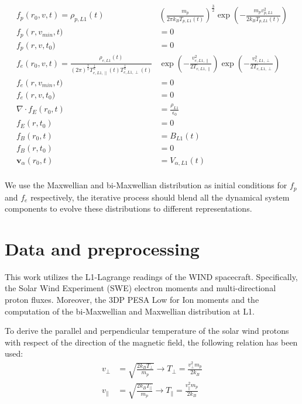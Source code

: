 \documentclass[12pt]{article}
\begin{document}
\begin{align*}
    f_p(r_0, v, t) = \rho_{p, L1}(t) &\left( \frac{m_p}{2 \pi k_B T_{p, L1}(t)}\right)^{\frac{3}{2}} \exp\left({-\frac{m_p v_{p, L1}^2}{2k_BT_{p, L1}(t)}}  \right) \\
    f_p\left(r, v_{min}, t) &= 0 \\
    f_p\left(r, v, t_0) &= 0 \\
        f_e(r_0, v, t) = \frac{\rho_{e, L1}(t)}{\left( 2 \pi \right)^{\frac{3}{2}} T_{e, L1, \parallel}^{\frac{1}{2}}(t)T_{e, L1, \perp}^{\frac{1}{2}}(t)} &\exp \left( - \frac{v_{e, L1, \parallel}^2}{2T_{e, L1, \parallel}} \right) \exp \left( - \frac{v_{e, L1, \perp}^2}{2T_{e, L1, \perp}} \right) \\
    f_e\left(r, v_{min}, t) &= 0 \\
    f_e\left(r, v, t_0) &= 0 \\
    \nabla \cdot f_E\left(r_0, t\right) &= \frac{\rho_{L1}}{\epsilon_0}\\
    f_E\left(r, t_0\right) &= 0 \\
    f_B\left(r_0, t\right) &= B_{L1}(t) \\
    f_B\left(r, t_0\right) &= 0 \\
    \mathbf{v}_\alpha \left(r_0, t\right) &= V_{\alpha, L1}(t) \\
\end{align*}

We use the Maxwellian and bi-Maxwellian distribution as initial conditions for $f_p$ and $f_e$ respectively, the iterative process should blend all the dynamical system components to evolve these distributions to different representations.

\section{Data and preprocessing}
This work utilizes the L1-Lagrange readings of the WIND spacecraft. Specifically, the Solar Wind Experiment (SWE) electron moments and multi-directional proton fluxes. Moreover, the 3DP PESA Low for Ion moments and the computation of the bi-Maxwellian and Maxwellian distribution at L1.

To derive the parallel and perpendicular temperature of the solar wind protons with respect of the direction of the magnetic field, the following relation has been used:
\begin{align*}
    v_\perp &= \sqrt{\frac{2k_BT_\perp}{m_p}} \to T_\perp = \frac{v_\perp^2 m_p}{2k_B}\\
    v_\parallel &= \sqrt{\frac{2k_BT_\parallel}{m_p}} \to T_\parallel = \frac{v_\parallel^2 m_p}{2k_B}\\
\end{align*}
\end{document}
